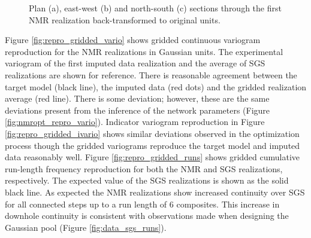 \begin{figure}
    \centering
    \tabskip=0pt
    \caption{Plan (a), east-west (b) and north-south (c) sections through the first \gls{NMR} realization back-transformed to original units.}
    \label{fig:orig_reals}
\end{figure}


Figure \ref{fig:repro_gridded_vario} shows gridded continuous variogram reproduction for the \gls{NMR} realizations in Gaussian units. The experimental variogram of the first imputed data realization and the average of \gls{SGS} realizations are shown for reference. There is reasonable agreement between the target model (black line), the imputed data (red dots) and the gridded realization average (red line). There is some deviation; however, these are the same deviations present from the inference of the network parameters (Figure \ref{fig:nmropt_repro_vario}). Indicator variogram reproduction in Figure \ref{fig:repro_gridded_ivario} shows similar deviations observed in the optimization process though the gridded variograms reproduce the target model and imputed data reasonably well. Figure \ref{fig:repro_gridded_runs} shows gridded cumulative run-length frequency reproduction for both the \gls{NMR} and \gls{SGS} realizations, respectively. The expected value of the \gls{SGS} realizations is shown as the solid black line. As expected the \gls{NMR} realizations show increased continuity over \gls{SGS} for all connected steps up to a run length of 6 composites. This increase in downhole continuity is consistent with observations made when designing the Gaussian pool (Figure \ref{fig:data_sgs_runs}).

